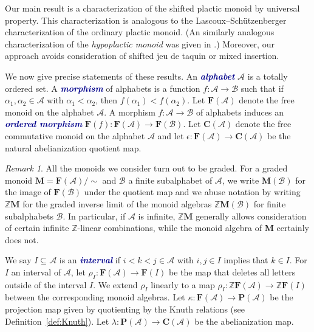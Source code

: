 \documentclass[12 pt]{amsart}
\newcommand{\newword}[1]{\textcolor{darkblue}{\textbf{\emph{#1}}}}
\newcommand{\Z}{\mathbb{Z}}
\newcommand{\Plactic}{{\mathbf{P}}}
\newcommand{\Free}{\mathbf{F}}
\newcommand{\Monoid}{\mathbf{M}}
\newcommand{\Abelian}{\mathbf{C}}
\newcommand{\cA}{\mathcal{A}}
\newcommand{\cB}{\mathcal{B}}
\newcommand{\cN}{\mathcal{N}}
\newcommand{\cNprime}{\mathcal{N'}}
\theoremstyle{remark}
\newtheorem{remark}[thm]{Remark}
\numberwithin{equation}{section}
\begin{document}
Our main result is a characterization of the shifted plactic monoid by universal property. This characterization is analogous to the Lascoux--Sch\"utzenberger characterization of the ordinary plactic monoid. (An similarly analogous characterization of the \emph{hypoplactic monoid} was given in \cite[Theorem~6.13]{Novelli}.)  Moreover, our approach avoids consideration of shifted jeu de taquin or mixed insertion. 

\medskip
We now give precise statements of these results.
An \newword{alphabet} $\cA$ is a totally ordered set. A \newword{morphism} of alphabets is a function $f : \cA \to \cB$ such that if $\alpha_1, \alpha_2 \in \cA$ with $\alpha_1 < \alpha_2$, then $f(\alpha_1) < f(\alpha_2)$. Let $\Free(\cA)$ denote the free monoid on the alphabet $\cA$. A morphism $f : \cA \to \cB$ of alphabets induces an \newword{ordered morphism} $\Free(f) : \Free(\cA) \to \Free(\cB)$. Let $\Abelian(\cA)$ denote the free commutative monoid on the alphabet $\cA$ and let $\epsilon : \Free(\cA) \to \Abelian(\cA)$ be the natural abelianization quotient map. 


\begin{remark}\label{rem:completion}
All the monoids we consider turn out to be graded. For a graded monoid $\Monoid = \Free(\cA)/ \sim$ and $\cB$ a finite subalphabet of $\cA$, we write $\Monoid(\cB)$ for the image of $\Free(\cB)$ under the quotient map and we abuse notation by writing $\Z \Monoid$ for the graded inverse limit of the monoid algebras $\Z\Monoid(\cB)$ for finite subalphabets $\cB$. In particular, if $\cA$ is infinite, $\Z \Monoid$ generally allows consideration of certain infinite $\Z$-linear combinations, while the monoid algebra of $\Monoid$ certainly does not.
\end{remark}

We say $I \subseteq \cA$ is an \newword{interval} if $i < k < j \in \cA$ with $i,j \in I$ implies that $k \in I$. For $I$ an interval of $\cA$, let $\rho_I : \Free(\cA) \to \Free(I)$ be the map that deletes all letters outside of the interval $I$. 
We extend $\rho_I$ linearly to a map $\rho_I : \Z \Free(\cA) \to \Z \Free(I)$ between the corresponding monoid algebras.
Let $\kappa : \Free(\cA) \to \Plactic(\cA)$ be the projection map given by quotienting by the Knuth relations (see Definition~\ref{def:Knuth}). Let $\lambda : \Plactic(\cA) \to \Abelian(\cA)$ be the abelianization map.
\end{document}
